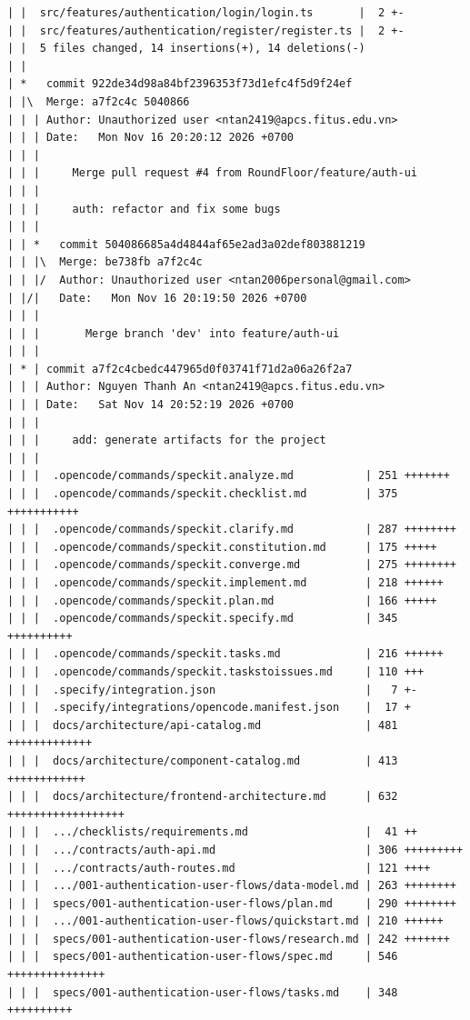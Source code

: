\documentclass[12pt]{article}
\begin{document}
\begin{lstlisting}[numbers=none,breaklines=true]
| |  src/features/authentication/login/login.ts       |  2 +-
| |  src/features/authentication/register/register.ts |  2 +-
| |  5 files changed, 14 insertions(+), 14 deletions(-)
| |
| *   commit 922de34d98a84bf2396353f73d1efc4f5d9f24ef
| |\  Merge: a7f2c4c 5040866
| | | Author: Unauthorized user <ntan2419@apcs.fitus.edu.vn>
| | | Date:   Mon Nov 16 20:20:12 2026 +0700
| | |
| | |     Merge pull request #4 from RoundFloor/feature/auth-ui
| | |
| | |     auth: refactor and fix some bugs
| | |
| | *   commit 504086685a4d4844af65e2ad3a02def803881219
| | |\  Merge: be738fb a7f2c4c
| | |/  Author: Unauthorized user <ntan2006personal@gmail.com>
| |/|   Date:   Mon Nov 16 20:19:50 2026 +0700
| | |
| | |       Merge branch 'dev' into feature/auth-ui
| | |
| * | commit a7f2c4cbedc447965d0f03741f71d2a06a26f2a7
| | | Author: Nguyen Thanh An <ntan2419@apcs.fitus.edu.vn>
| | | Date:   Sat Nov 14 20:52:19 2026 +0700
| | |
| | |     add: generate artifacts for the project
| | |
| | |  .opencode/commands/speckit.analyze.md           | 251 +++++++
| | |  .opencode/commands/speckit.checklist.md         | 375 +++++++++++
| | |  .opencode/commands/speckit.clarify.md           | 287 ++++++++
| | |  .opencode/commands/speckit.constitution.md      | 175 +++++
| | |  .opencode/commands/speckit.converge.md          | 275 ++++++++
| | |  .opencode/commands/speckit.implement.md         | 218 ++++++
| | |  .opencode/commands/speckit.plan.md              | 166 +++++
| | |  .opencode/commands/speckit.specify.md           | 345 ++++++++++
| | |  .opencode/commands/speckit.tasks.md             | 216 ++++++
| | |  .opencode/commands/speckit.taskstoissues.md     | 110 +++
| | |  .specify/integration.json                       |   7 +-
| | |  .specify/integrations/opencode.manifest.json    |  17 +
| | |  docs/architecture/api-catalog.md                | 481 +++++++++++++
| | |  docs/architecture/component-catalog.md          | 413 ++++++++++++
| | |  docs/architecture/frontend-architecture.md      | 632 ++++++++++++++++++
| | |  .../checklists/requirements.md                  |  41 ++
| | |  .../contracts/auth-api.md                       | 306 +++++++++
| | |  .../contracts/auth-routes.md                    | 121 ++++
| | |  .../001-authentication-user-flows/data-model.md | 263 ++++++++
| | |  specs/001-authentication-user-flows/plan.md     | 290 ++++++++
| | |  .../001-authentication-user-flows/quickstart.md | 210 ++++++
| | |  specs/001-authentication-user-flows/research.md | 242 +++++++
| | |  specs/001-authentication-user-flows/spec.md     | 546 +++++++++++++++
| | |  specs/001-authentication-user-flows/tasks.md    | 348 ++++++++++

\end{lstlisting}
\end{document}
